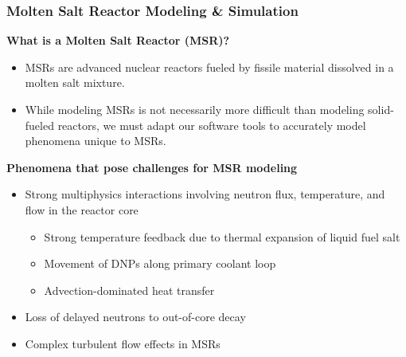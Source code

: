 
\begin{frame}
  \frametitle{Molten Salt Reactor Modeling \& Simulation}
  \textbf{What is a Molten Salt Reactor (MSR)?}
  \begin{itemize}
	\item MSRs are advanced nuclear reactors fueled by fissile
	  material dissolved in a molten salt mixture.
    \item While modeling MSRs is not necessarily more difficult than modeling solid-fueled
      reactors, we must adapt our software tools to accurately model phenomena unique to MSRs.
  \end{itemize}

  \textbf{Phenomena that pose challenges for MSR modeling}
  \begin{itemize}
	\item Strong multiphysics interactions involving neutron flux, temperature, and flow in the
      reactor core
	  \begin{itemize}
		\item Strong temperature feedback due to thermal expansion of liquid fuel salt
		\item Movement of \glspl{DNP} along primary coolant loop
        \item Advection-dominated heat transfer
	  \end{itemize}
    \item Loss of delayed neutrons to out-of-core decay
    \item Complex turbulent flow effects in MSRs
  \end{itemize}
\end{frame}

